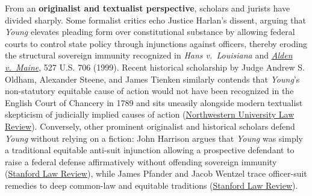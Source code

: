 \documentclass[12pt]{article}
\begin{document}
From an \textbf{originalist and textualist perspective}, scholars and jurists have divided sharply. Some formalist critics echo Justice Harlan's dissent, arguing that \textit{Young} elevates pleading form over constitutional substance by allowing federal courts to control state policy through injunctions against officers, thereby eroding the structural sovereign immunity recognized in \textit{Hans v.\ Louisiana} and \href{https://supreme.justia.com/cases/federal/us/527/706/}{\textit{Alden v.\ Maine}}, 527 U.S. 706 (1999). Recent historical scholarship by Judge Andrew S. Oldham, Alexander Steene, and James Tienken similarly contends that \textit{Young}'s non-statutory equitable cause of action would not have been recognized in the English Court of Chancery in 1789 and sits uneasily alongside modern textualist skepticism of judicially implied causes of action (\href{https://scholarlycommons.law.northwestern.edu/cgi/viewcontent.cgi?article=1648&context=nulr}{Northwestern University Law Review}). Conversely, other prominent originalist and historical scholars defend \textit{Young} without relying on a fiction: John Harrison argues that \textit{Young} was simply a traditional equitable anti-suit injunction allowing a prospective defendant to raise a federal defense affirmatively without offending sovereign immunity (\href{https://review.law.stanford.edu/print/article/ex-parte-young/}{Stanford Law Review}), while James Pfander and Jacob Wentzel trace officer-suit remedies to deep common-law and equitable traditions (\href{https://review.law.stanford.edu/wp-content/uploads/sites/3/2020/05/Pfander-Wentzel-72-Stan.-L.-Rev.-1269.pdf}{Stanford Law Review}).
\end{document}
